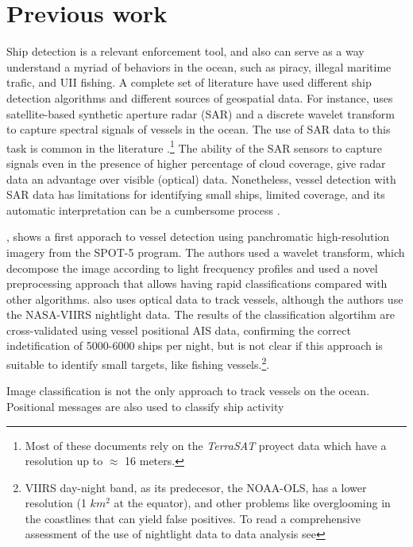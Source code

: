 \section{Previous work}

Ship detection is a relevant enforcement tool, and also can serve as a way understand a myriad of behaviors in the ocean, such as piracy, illegal maritime trafic, and UII fishing. A complete set of literature have used different ship detection algorithms and different sources of geospatial data. For instance,  uses satellite-based synthetic aperture radar (SAR) and a discrete wavelet transform to capture spectral signals of vessels in the ocean. The use of SAR data to this task is common in the literature \cite{Margarit2009, Brusch2011, Corbane2008, Paes2010}.\footnote{Most of these documents rely on the \textit{TerraSAT} proyect data which have a resolution up to $\approx$ 16 meters.} The ability of the SAR sensors to capture signals even in the presence of higher percentage of cloud coverage, give radar data an advantage over visible (optical) data. Nonetheless, vessel detection with SAR data has limitations for identifying small ships, limited coverage, and its automatic interpretation can be a cumbersome process \cite{Zhang2006}.  

, shows a first apporach to vessel detection using panchromatic high-resolution imagery from the SPOT-5 program. The authors used a wavelet transform, which decompose the image according to light frecquency profiles and used a novel preprocessing approach that allows having rapid classifications compared with other algorithms.  also uses optical data to track vessels, although the authors use the NASA-VIIRS nightlight data. The results of the classification algortihm are cross-validated using vessel positional AIS data, confirming the correct indetification of 5000-6000 ships per night, but is not clear if this approach is suitable to identify small targets, like fishing vessels.\footnote{VIIRS day-night band, as its predecesor, the NOAA-OLS, has a lower resolution (1 $km^{2}$ at the equator), and other problems like overglooming in the coastlines that can yield false positives. To read a comprehensive assessment of the use of nightlight data to data analysis see }.

Image classification is not the only approach to track vessels on the ocean. Positional messages are also used to classify ship activity 


